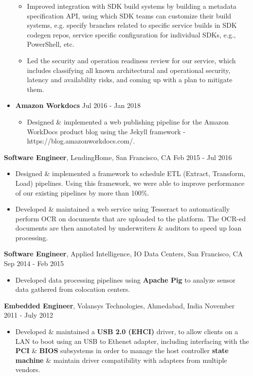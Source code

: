 \documentclass[10pt, a4paper]{article}
\begin{document}
\begin{itemize}
\begin{itemize}[label=$\bullet$]
  \item Improved integration with SDK build systems by building a metadata specification API, using which SDK teams can customize their build systems, e.g. specify branches related to specific service builds in SDK codegen repos, service specific configuration for individual SDKs, e.g., PowerShell, etc.
  \item Led the security and operation readiness review for our service, which includes classifying all known architectural and operational security, latency and availability risks, and coming up with a plan to mitigate them.
  \end{itemize}
\item \textbf{Amazon Workdocs} \hfill Jul 2016 - Jan 2018
  \begin{itemize}[label=$\bullet$]
    \item Designed \& implemented a web publishing pipeline for the Amazon WorkDocs product blog using the Jekyll framework - https://blog.amazonworkdocs.com/.
  \end{itemize}
\end{itemize}
\textbf{Software Engineer}, LendingHome, San Francisco, CA \hfill Feb 2015 - Jul 2016
\begin{itemize}
\item Designed \& implemented a framework to schedule ETL (Extract, Transform, Load) pipelines. Using this framework, we were able to improve performance of our existing pipelines by more than 100\%.
\item Developed \& maintained a web service using Tesseract to automatically perform OCR on documents that are uploaded to the platform. The OCR-ed documents are then annotated by underwriters \& auditors to speed up loan processing.
\end{itemize}
\textbf{Software Engineer}, Applied Intelligence, IO Data Centers, San Francisco, CA \hfill Sep 2014 - Feb 2015
\begin{itemize}
\item Developed data processing pipelines using \textbf{Apache Pig} to analyze sensor data gathered from colocation centers.
\end{itemize}
\textbf{Embedded Engineer}, Volansys Technologies, Ahmedabad, India \hfill November 2011 - July 2012
\begin{itemize}
\item Developed \& maintained a \textbf{USB 2.0 (EHCI)} driver, to allow clients on a LAN to boot using an USB to Ethenet adapter, including interfacing with the \textbf{PCI} \& \textbf{BIOS} subsystems in order to manage the host controller \textbf{state machine} \& maintain driver compatibility with adapters from multiple vendors. 
\end{itemize}
\end{document}
